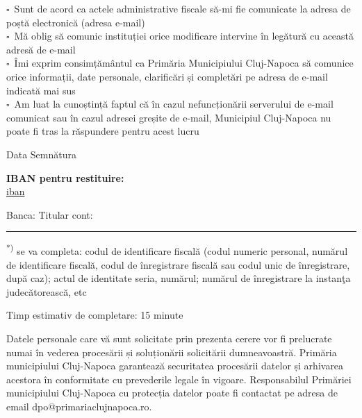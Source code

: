 \documentclass[11pt,a4paper]{article}
\newcommand{\fillline}[1][6cm]{\underline{\hspace{#1}}}
\newcommand{\checkboxempty}{$\square$}
\begin{document}
\vspace{0.2cm}

\checkboxempty\ Sunt de acord ca actele administrative fiscale să-mi fie comunicate la adresa de poștă electronică (adresa e-mail)\\
\checkboxempty\ Mă oblig să comunic instituției orice modificare intervine în legătură cu această adresă de e-mail\\
\checkboxempty\ Îmi exprim consimțământul ca Primăria Municipiului Cluj-Napoca să comunice orice informații, date personale, clarificări și completări pe adresa de e-mail indicată mai sus\\
\checkboxempty\ Am luat la cunoștință faptul că în cazul nefuncționării serverului de e-mail comunicat sau în cazul adresei greșite de e-mail, Municipiul Cluj-Napoca nu poate fi tras la răspundere pentru acest lucru

\vspace{0.25cm}

Data \fillline[4cm] \hfill Semnătura \fillline[5cm]

\vspace{0.3cm}

\textbf{IBAN pentru restituire:}\\
\underline{ {{iban}} }

\vspace{0.3cm}

Banca: \fillline[8cm] \hfill Titular cont: \fillline[6cm]

\vspace{0.3cm}
\hrule
\vspace{0.2cm}

\tiny
\textsuperscript{*)} se va completa: codul de identificare fiscală (codul numeric personal, numărul de identificare fiscală, codul de înregistrare fiscală sau codul unic de înregistrare, după caz); actul de identitate seria, numărul; numărul de înregistrare la instanţa judecătorească, etc

\vspace{0.1cm}

Timp estimativ de completare: 15 minute

\vspace{0.05cm}

Datele personale care vă sunt solicitate prin prezenta cerere vor fi prelucrate numai în vederea procesării și soluționării solicitării dumneavoastră. Primăria municipiului Cluj-Napoca garantează securitatea procesării datelor și arhivarea acestora în conformitate cu prevederile legale în vigoare. Responsabilul Primăriei municipiului Cluj-Napoca cu protecția datelor poate fi contactat pe adresa de email dpo@primariaclujnapoca.ro.
\end{document}
